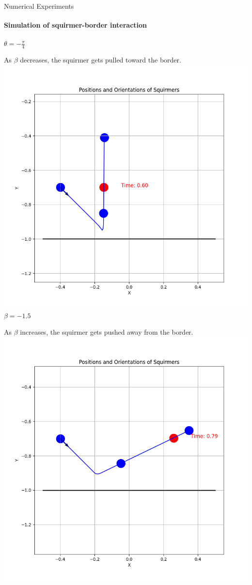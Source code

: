 \documentclass{beamer}
\begin{document}
\begin{frame}{Numerical Experiments}
    \framesubtitle{Simulation of squirmer-border interaction}
    \begin{center}
        \textbf{$\theta = -\frac{\pi}{4}$}
    \end{center}
    \begin{minipage}{0.49\textwidth}
        \centering
        As $\beta$ decreases, the squirmer gets pulled toward the border.
        \includegraphics[width=1\textwidth]{../../graphs/simulations/border/betam1_5/mpi_4.png}
        $\beta = -1.5$
    \end{minipage}
    \begin{minipage}{0.49\textwidth}
        \centering
        As $\beta$ increases, the squirmer gets pushed away from the border.
        \includegraphics[width=1\textwidth]{../../graphs/simulations/border/beta1_5/mpi_4.png}

\end{minipage}
\end{frame}
\end{document}
